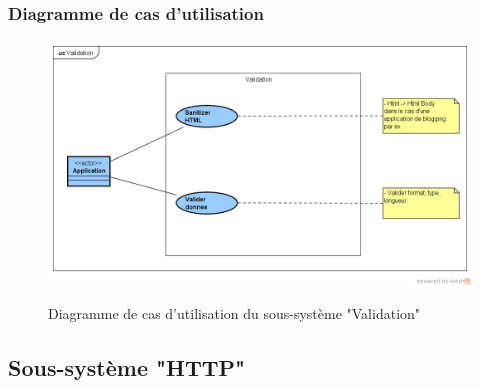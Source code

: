 \subsubsection{Diagramme de cas d'utilisation}
\begin{figure}[H]
	\centering
	\begin{minipage}{12cm}
		\centering
		{\includegraphics[height=0.35\textheight, width=1\textwidth]{fig/Validation-use-case-diagram.png}}
	\end{minipage}
	\caption{Diagramme de cas d'utilisation du sous-système "Validation"}
	\label{fig:7.16}
\end{figure}

\subsection{Sous-système "HTTP"}
